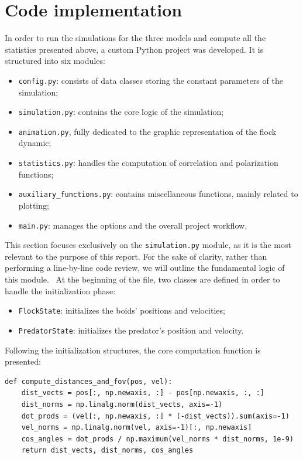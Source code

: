\section{Code implementation}
In order to run the simulations for the three models and compute all the statistics presented above, a custom Python project was developed. It is structured into six modules:

\begin{itemize}
    \item \texttt{config.py}: consists of data classes storing the constant parameters of the simulation;
    \item \texttt{simulation.py}: contains the core logic of the simulation;
    \item \texttt{animation.py}, fully dedicated to the graphic representation of the flock dynamic;
    \item \texttt{statistics.py}: handles the computation of correlation and polarization functions;
    \item\texttt{auxiliary\_functions.py}: contains miscellaneous functions, mainly related to plotting;
    \item \texttt{main.py}: manages the options and the overall project workflow.
\end{itemize}

This section focuses exclusively on the \texttt{simulation.py} module, as it is the most relevant to the purpose of this report. For the sake of clarity, rather than performing a line-by-line code review, we will outline the fundamental logic of this module. \
At the beginning of the file, two classes are defined in order to handle the initialization phase:

\begin{itemize}
    \item \texttt{FlockState}: initializes the boids' positions and velocities;
    \item \texttt{PredatorState}: initializes the predator's position and velocity.
\end{itemize}

Following the initialization structures, the core computation function is presented:

\begin{verbatim}
def compute_distances_and_fov(pos, vel):
    dist_vects = pos[:, np.newaxis, :] - pos[np.newaxis, :, :]
    dist_norms = np.linalg.norm(dist_vects, axis=-1)
    dot_prods = (vel[:, np.newaxis, :] * (-dist_vects)).sum(axis=-1)
    vel_norms = np.linalg.norm(vel, axis=-1)[:, np.newaxis]
    cos_angles = dot_prods / np.maximum(vel_norms * dist_norms, 1e-9)
    return dist_vects, dist_norms, cos_angles
\end{verbatim}

